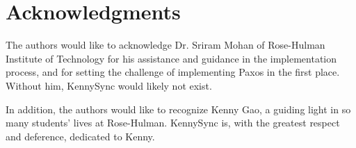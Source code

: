 \documentclass{acm_proc_article-sp}
\begin{document}
\section{Acknowledgments}

The authors would like to acknowledge Dr. Sriram Mohan of Rose-Hulman Institute
of Technology for his assistance and guidance in the implementation process, and
for setting the challenge of implementing Paxos in the first place. Without him,
KennySync would likely not exist.

In addition, the authors would like to recognize Kenny Gao, a guiding light in
so many students' lives at Rose-Hulman. KennySync is, with the greatest respect
and deference, dedicated to Kenny.

%

%
%
\balancecolumns
\end{document}
